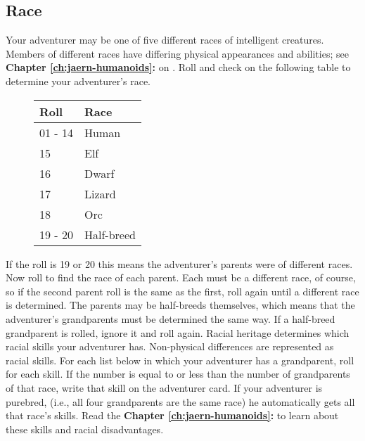\begin{multicols*}{2}
\section{Race}
Your adventurer may be one of five different races of intelligent creatures. Members of different races have differing physical appearances and abilities; see \textbf{Chapter \ref{ch:jaern-humanoids}: } on \tcpage{\pageref{ch:jaern-humanoids}}. Roll  and check on the following table to determine your adventurer's race.\\
\begin{wrapfigure}[11]{o}[0pt]{3.5cm}
\vspace{-10pt}
\begin{normbox}
\begin{tabular}{l l}
Roll & Race\\
\midrule
01 - 14 & Human\\
15 & Elf\\
16 & Dwarf \\
17 & Lizard\\
18 & Orc\\
19 - 20 & Half-breed\\
\end{tabular}
\end{normbox}
\end{wrapfigure}
\normalsize
If the roll is 19 or 20 this means the adventurer's parents were of different races. Now roll to find the race of each parent. Each must be a different race, of course, so if the second parent roll is the same as the first, roll again until a different race is determined. The parents may be half-breeds themselves, which means that the adventurer's grandparents must be determined the same way. If a half-breed grandparent is rolled, ignore it and roll again. Racial heritage determines which racial skills your adventurer has. Non-physical differences are represented as racial skills. For each list below in which your adventurer has a grandparent, roll  for each skill. If the number is equal to or less than the number of grandparents of that race, write that skill on the adventurer card. If your adventurer is purebred, (i.e., all four grandparents are the same race) he automatically gets all that race's skills. Read the \textbf{Chapter \ref{ch:jaern-humanoids}: } to learn about these skills and racial disadvantages.


\end{multicols*}
